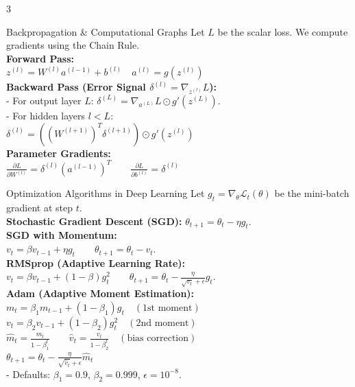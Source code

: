 \documentclass[10pt]{article}
\begin{document}
\begin{multicols*}{3}
\begin{dlBox}{Backpropagation \& Computational Graphs}
Let $L$ be the scalar loss. We compute gradients using the Chain Rule. \\
\textbf{Forward Pass:} \\
$z^{(l)} = W^{(l)} a^{(l-1)} + b^{(l)} \quad a^{(l)} = g\left(z^{(l)}\right)$ \\
\textbf{Backward Pass (Error Signal $\delta^{(l)} = \nabla_{z^{(l)}} L$):} \\
- For output layer $L$: $\delta^{(L)} = \nabla_{a^{(L)}} L \odot g'\left(z^{(L)}\right)$. \\
- For hidden layers $l < L$: \\
  $\delta^{(l)} = \left( (W^{(l+1)})^T \delta^{(l+1)} \right) \odot g'\left(z^{(l)}\right)$ \\
\textbf{Parameter Gradients:} \\
$\frac{\partial L}{\partial W^{(l)}} = \delta^{(l)} \left(a^{(l-1)}\right)^T \qquad \frac{\partial L}{\partial b^{(l)}} = \delta^{(l)}$
\end{dlBox}

\begin{dlBox}{Optimization Algorithms in Deep Learning}
Let $g_t = \nabla_{\theta} \mathcal{L}_t(\theta)$ be the mini-batch gradient at step $t$. \\
\textbf{Stochastic Gradient Descent (SGD):} $\theta_{t+1} = \theta_t - \eta g_t$. \\
\textbf{SGD with Momentum:} \\
$v_t = \beta v_{t-1} + \eta g_t \qquad \theta_{t+1} = \theta_t - v_t$. \\
\textbf{RMSprop (Adaptive Learning Rate):} \\
$v_t = \beta v_{t-1} + (1-\beta) g_t^2 \qquad \theta_{t+1} = \theta_t - \frac{\eta}{\sqrt{v_t} + \epsilon} g_t$. \\
\textbf{Adam (Adaptive Moment Estimation):} \\
$m_t = \beta_1 m_{t-1} + (1-\beta_1) g_t \quad (\text{1st moment})$ \\
$v_t = \beta_2 v_{t-1} + (1-\beta_2) g_t^2 \quad (\text{2nd moment})$ \\
$\hat{m}_t = \frac{m_t}{1 - \beta_1^t} \qquad \hat{v}_t = \frac{v_t}{1 - \beta_2^t} \quad (\text{bias correction})$ \\
$\theta_{t+1} = \theta_t - \frac{\eta}{\sqrt{\hat{v}_t} + \epsilon} \hat{m}_t$ \\
- Defaults: $\beta_1 = 0.9$, $\beta_2 = 0.999$, $\epsilon = 10^{-8}$.
\end{dlBox}


\end{multicols*}
\end{document}

